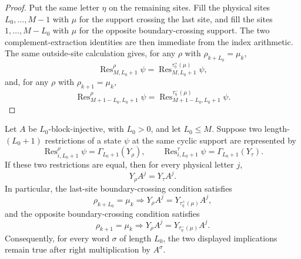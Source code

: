 \begin{proof}
    \leanok
    Put the same letter $\eta$ on the remaining sites. Fill the physical sites
    $L_0,\ldots,M-1$ with $\mu$ for the support crossing the last site, and fill
    the sites $1,\ldots,M-L_0$ with $\mu$ for the opposite boundary-crossing
    support.
    The two complement-extraction identities are then immediate from the index
    arithmetic. The same outside-site calculation gives, for any $\rho$ with
    $\rho_{k+L_0}=\mu_k$,
    \[
        \operatorname{Res}^{\rho}_{M,L_0+1}\psi
        =
        \operatorname{Res}^{\tau^+_\eta(\mu)}_{M,L_0+1}\psi,
    \]
    and, for any $\rho$ with $\rho_{k+1}=\mu_k$,
    \[
        \operatorname{Res}^{\rho}_{M+1-L_0,L_0+1}\psi
        =
        \operatorname{Res}^{\tau^-_\eta(\mu)}_{M+1-L_0,L_0+1}\psi.
    \]
\end{proof}

\begin{lemma}
    \label{lem:boundary_assignment_first_letter_products}
    \leanok
    Let $A$ be $L_0$-block-injective, with $L_0>0$, and let $L_0\le M$.
    Suppose two length-$(L_0+1)$ restrictions of a state $\psi$ at the same
    cyclic support are represented by
    \[
        \operatorname{Res}^{\rho}_{i,L_0+1}\psi=\Gamma_{L_0+1}(Y_\rho),
        \qquad
        \operatorname{Res}^{\tau}_{i,L_0+1}\psi=\Gamma_{L_0+1}(Y_\tau).
    \]
    If these two restrictions are equal, then for every physical letter $j$,
    \[
        Y_\rho A^j = Y_\tau A^j .
    \]
    In particular, the last-site boundary-crossing condition satisfies
    \[
        \rho_{k+L_0}=\mu_k
        \Longrightarrow
        Y_\rho A^j = Y_{\tau^+_\eta(\mu)}A^j,
    \]
    and the opposite boundary-crossing condition satisfies
    \[
        \rho_{k+1}=\mu_k
        \Longrightarrow
        Y_\rho A^j = Y_{\tau^-_\eta(\mu)}A^j .
    \]
    Consequently, for every word $\sigma$ of length $L_0$, the two displayed
    implications remain true after right multiplication by $A^\sigma$.
\end{lemma}

